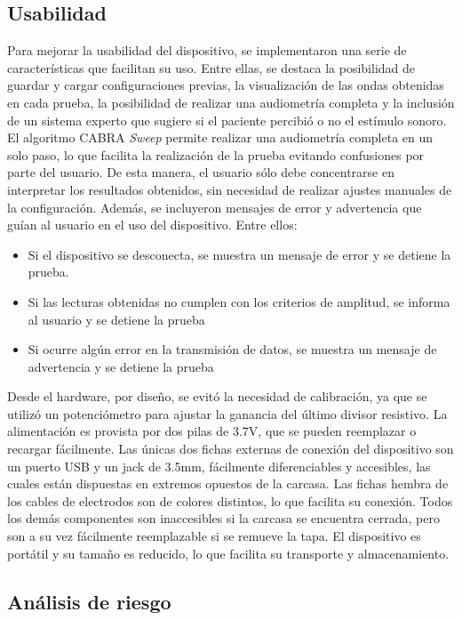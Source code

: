 \subsection{Usabilidad}

Para mejorar la usabilidad del dispositivo, se implementaron una serie de características que facilitan su uso.
Entre ellas, se destaca la posibilidad de guardar y cargar configuraciones previas, la visualización de las ondas
obtenidas en cada prueba, la posibilidad de realizar una audiometría completa y la inclusión de un sistema experto
que sugiere si el paciente percibió o no el estímulo sonoro.
El algoritmo CABRA \textit{Sweep} permite realizar una audiometría completa en un solo paso, lo que facilita la
realización de la prueba evitando confusiones por parte del usuario.
De esta manera, el usuario sólo debe concentrarse en interpretar los resultados obtenidos, sin necesidad de realizar
ajustes manuales de la configuración.
Además, se incluyeron mensajes de error y advertencia que guían al usuario en el uso del dispositivo.
Entre ellos:

\begin{itemize}
    \item Si el dispositivo se desconecta, se muestra un mensaje de error y se detiene la prueba.
    \item Si las lecturas obtenidas no cumplen con los criterios de amplitud, se informa al usuario y se detiene la
    prueba
    \item Si ocurre algún error en la transmisión de datos, se muestra un mensaje de advertencia y se detiene la prueba
\end{itemize}

Desde el hardware, por diseño, se evitó la necesidad de calibración, ya que se utilizó un potenciómetro para ajustar la
ganancia del último divisor resistivo.
La alimentación es provista por dos pilas de 3.7V, que se pueden reemplazar o recargar fácilmente.
Las únicas dos fichas externas de conexión del dispositivo son un puerto USB y un jack de 3.5mm, fácilmente
diferenciables y accesibles, las cuales están dispuestas en extremos opuestos de la carcasa.
Las fichas hembra de los cables de electrodos son de colores distintos, lo que facilita su conexión.
Todos los demás componentes son inaccesibles si la carcasa se encuentra cerrada, pero son a su vez fácilmente
reemplazable si se remueve la tapa.
El dispositivo es portátil y su tamaño es reducido, lo que facilita su transporte y almacenamiento.

\subsection{Análisis de riesgo}

